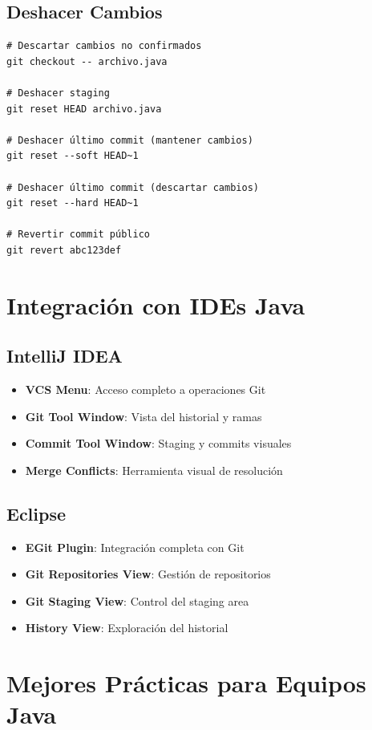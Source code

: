 \documentclass[12pt,a4paper]{article}
\begin{document}
\subsection{Deshacer Cambios}
\begin{lstlisting}[caption=Deshacer diferentes tipos de cambios]
# Descartar cambios no confirmados
git checkout -- archivo.java

# Deshacer staging
git reset HEAD archivo.java

# Deshacer último commit (mantener cambios)
git reset --soft HEAD~1

# Deshacer último commit (descartar cambios)
git reset --hard HEAD~1

# Revertir commit público
git revert abc123def
\end{lstlisting}

\section{Integración con IDEs Java}

\subsection{IntelliJ IDEA}
\begin{itemize}
    \item \textbf{VCS Menu}: Acceso completo a operaciones Git
    \item \textbf{Git Tool Window}: Vista del historial y ramas
    \item \textbf{Commit Tool Window}: Staging y commits visuales
    \item \textbf{Merge Conflicts}: Herramienta visual de resolución
\end{itemize}

\subsection{Eclipse}
\begin{itemize}
    \item \textbf{EGit Plugin}: Integración completa con Git
    \item \textbf{Git Repositories View}: Gestión de repositorios
    \item \textbf{Git Staging View}: Control del staging area
    \item \textbf{History View}: Exploración del historial
\end{itemize}

\section{Mejores Prácticas para Equipos Java}
\end{document}
